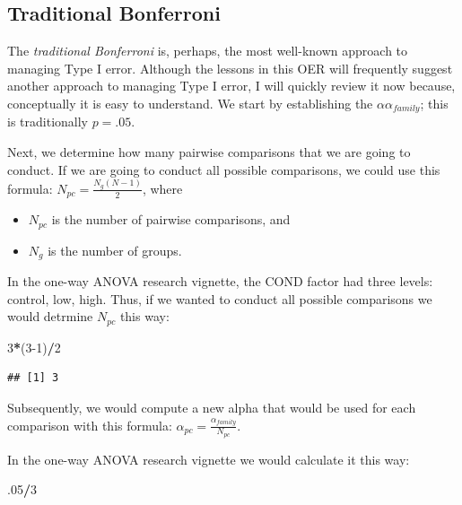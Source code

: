 \documentclass[
  11pt,
]{book}
\newenvironment{Shaded}{\begin{snugshade}}{\end{snugshade}}
\newcommand{\DecValTok}[1]{\textcolor[rgb]{0.06,0.06,0.06}{#1}}
\newcommand{\NormalTok}[1]{#1}
\newcommand{\SpecialCharTok}[1]{\textcolor[rgb]{0.43,0.43,0.43}{\textbf{#1}}}
\providecommand{\tightlist}{%
  \setlength{\itemsep}{0pt}\setlength{\parskip}{0pt}}
\begin{document}
\hypertarget{traditional-bonferroni}{%
\subsection*{Traditional Bonferroni}\label{traditional-bonferroni}}


The \emph{traditional Bonferroni} is, perhaps, the most well-known approach to managing Type I error. Although the lessons in this OER will frequently suggest another approach to managing Type I error, I will quickly review it now because, conceptually it is easy to understand. We start by establishing the \(\alpha\alpha_{family}\); this is traditionally \(p = .05\).

Next, we determine how many pairwise comparisons that we are going to conduct. If we are going to conduct all possible comparisons, we could use this formula: \(N_{pc}=\frac{N_{g}(N-1)}{2}\), where

\begin{itemize}
\tightlist
\item
  \(N_{pc}\) is the number of pairwise comparisons, and
\item
  \(N_{g}\) is the number of groups.
\end{itemize}

In the one-way ANOVA research vignette, the COND factor had three levels: control, low, high. Thus, if we wanted to conduct all possible comparisons we would detrmine \(N_{pc}\) this way:

\begin{Shaded}
\begin{Highlighting}[]
\DecValTok{3}\SpecialCharTok{*}\NormalTok{(}\DecValTok{3{-}1}\NormalTok{)}\SpecialCharTok{/}\DecValTok{2}
\end{Highlighting}
\end{Shaded}

\begin{verbatim}
## [1] 3
\end{verbatim}

Subsequently, we would compute a new alpha that would be used for each comparison with this formula: \(\alpha_{pc}=\frac{\alpha_{family}}{N_{pc}}\).

In the one-way ANOVA research vignette we would calculate it this way:

\begin{Shaded}
\begin{Highlighting}[]
\NormalTok{.}\DecValTok{05}\SpecialCharTok{/}\DecValTok{3}
\end{Highlighting}
\end{Shaded}
\end{document}
